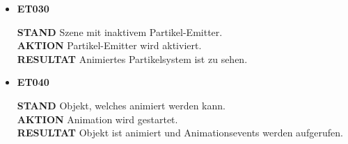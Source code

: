 \documentclass[parskip=full]{scrartcl}
\begin{document}
\begin{itemize} [label={}]
		\item \textbf{ET030}\par
			\textbf{STAND} Szene mit inaktivem Partikel-Emitter.\\
			\textbf{AKTION} Partikel-Emitter wird aktiviert.\\
			\textbf{RESULTAT} Animiertes Partikelsystem ist zu sehen.\\\par

		\pagebreak
		\item \textbf{ET040}\par
			\textbf{STAND} Objekt, welches animiert werden kann.\\
			\textbf{AKTION} Animation wird gestartet.\\
			\textbf{RESULTAT} Objekt ist animiert und Animationsevents werden aufgerufen.\\\par
	\end{itemize}
\end{document}
